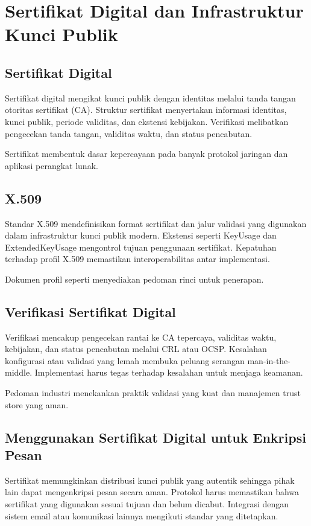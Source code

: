 \documentclass[../main.tex]{subfiles}
\begin{document}
\chapter{Sertifikat Digital dan Infrastruktur Kunci Publik}

\section{Sertifikat Digital}
Sertifikat digital mengikat kunci publik dengan identitas melalui tanda tangan otoritas sertifikat (CA). Struktur sertifikat menyertakan informasi identitas, kunci publik, periode validitas, dan ekstensi kebijakan. Verifikasi melibatkan pengecekan tanda tangan, validitas waktu, dan status pencabutan.

Sertifikat membentuk dasar kepercayaan pada banyak protokol jaringan dan aplikasi perangkat lunak.

\section{X.509}
Standar X.509 mendefinisikan format sertifikat dan jalur validasi yang digunakan dalam infrastruktur kunci publik modern. Ekstensi seperti KeyUsage dan ExtendedKeyUsage mengontrol tujuan penggunaan sertifikat. Kepatuhan terhadap profil X.509 memastikan interoperabilitas antar implementasi.

Dokumen profil seperti \textcite{rfc5280} menyediakan pedoman rinci untuk penerapan.

\section{Verifikasi Sertifikat Digital}
Verifikasi mencakup pengecekan rantai ke CA tepercaya, validitas waktu, kebijakan, dan status pencabutan melalui CRL atau OCSP. Kesalahan konfigurasi atau validasi yang lemah membuka peluang serangan man-in-the-middle. Implementasi harus tegas terhadap kesalahan untuk menjaga keamanan.

Pedoman industri menekankan praktik validasi yang kuat dan manajemen trust store yang aman.

\section{Menggunakan Sertifikat Digital untuk Enkripsi Pesan}
Sertifikat memungkinkan distribusi kunci publik yang autentik sehingga pihak lain dapat mengenkripsi pesan secara aman. Protokol harus memastikan bahwa sertifikat yang digunakan sesuai tujuan dan belum dicabut. Integrasi dengan sistem email atau komunikasi lainnya mengikuti standar yang ditetapkan.
\end{document}
